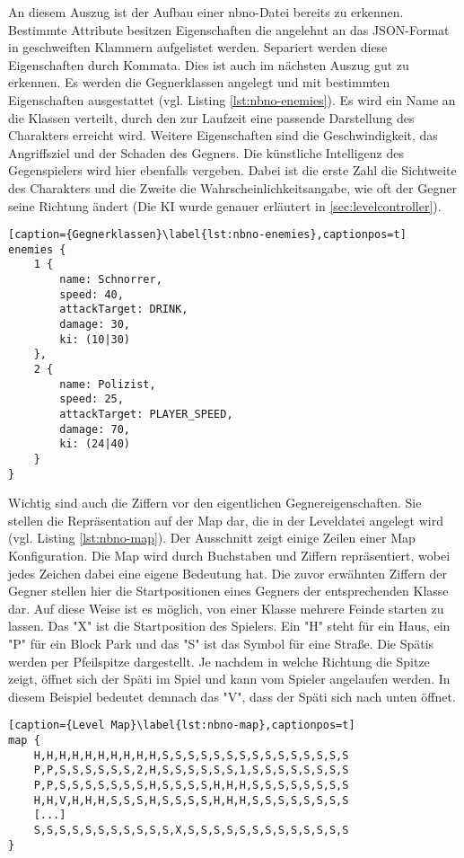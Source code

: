 An diesem Auszug ist der Aufbau einer nbno-Datei bereits zu erkennen. Bestimmte Attribute besitzen Eigenschaften die angelehnt an das JSON-Format in geschweiften Klammern aufgelistet werden. Separiert werden diese Eigenschaften durch Kommata.\newline
Dies ist auch im nächsten Auszug gut zu erkennen. Es werden die Gegnerklassen angelegt und mit bestimmten Eigenschaften ausgestattet (vgl. Listing \ref{lst:nbno-enemies}). Es wird ein Name an die Klassen verteilt, durch den zur Laufzeit eine passende Darstellung des Charakters erreicht wird. Weitere Eigenschaften sind die Geschwindigkeit, das Angriffsziel und der Schaden des Gegners. Die künstliche Intelligenz des Gegenspielers wird hier ebenfalls vergeben. Dabei ist die erste Zahl die Sichtweite des Charakters und die Zweite die Wahrscheinlichkeitsangabe, wie oft der Gegner seine Richtung ändert (Die KI wurde genauer erläutert in \ref{sec:levelcontroller}).\newline
\begin{lstlisting}[caption={Gegnerklassen}\label{lst:nbno-enemies},captionpos=t] 
enemies {
    1 {
        name: Schnorrer,
        speed: 40,
        attackTarget: DRINK,
        damage: 30,
        ki: (10|30)
    },
    2 {
        name: Polizist,
        speed: 25,
        attackTarget: PLAYER_SPEED,
        damage: 70,
        ki: (24|40)
    }
}
\end{lstlisting}

Wichtig sind auch die Ziffern vor den eigentlichen Gegnereigenschaften. Sie stellen die Repräsentation auf der Map dar, die in der Leveldatei angelegt wird (vgl. Listing \ref{lst:nbno-map}). Der Ausschnitt zeigt einige Zeilen einer Map Konfiguration. Die Map wird durch Buchstaben und Ziffern repräsentiert, wobei jedes Zeichen dabei eine eigene Bedeutung hat. Die zuvor erwähnten Ziffern der Gegner stellen hier die Startpositionen eines Gegners der entsprechenden Klasse dar. Auf diese Weise ist es möglich, von einer Klasse mehrere Feinde starten zu lassen.\newline
Das "X" ist die Startposition des Spielers. Ein "H" steht für ein Haus, ein "P" für ein Block Park und das "S" ist das Symbol für eine Straße. Die Spätis werden per Pfeilspitze dargestellt. Je nachdem in welche Richtung die Spitze zeigt, öffnet sich der Späti im Spiel und kann vom Spieler angelaufen werden. In diesem Beispiel bedeutet demnach das "V", dass der Späti sich nach unten öffnet. \newline
\begin{minipage}{\linewidth}
\begin{lstlisting}[caption={Level Map}\label{lst:nbno-map},captionpos=t] 
map {
    H,H,H,H,H,H,H,H,H,H,S,S,S,S,S,S,S,S,S,S,S,S,S,S,S
    P,P,S,S,S,S,S,S,2,H,S,S,S,S,S,S,1,S,S,S,S,S,S,S,S
    P,P,S,S,S,S,S,S,S,H,S,S,S,S,H,H,H,S,S,S,S,S,S,S,S
    H,H,V,H,H,H,S,S,S,H,S,S,S,S,H,H,H,S,S,S,S,S,S,S,S
	[...]
    S,S,S,S,S,S,S,S,S,S,S,X,S,S,S,S,S,S,S,S,S,S,S,S,S
}
\end{lstlisting}
\end{minipage}

